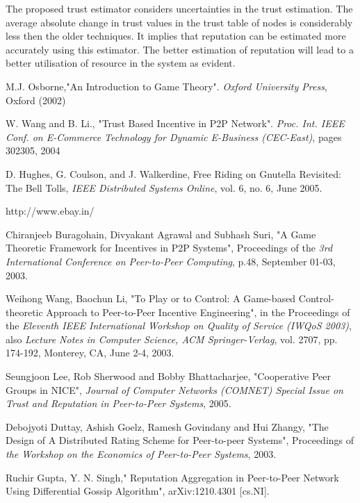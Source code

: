 \documentclass{IEEEtran}
\begin{document}
The proposed trust estimator considers uncertainties in the trust estimation.  The average absolute change in trust values in the trust table of nodes is considerably less then the older techniques. It implies that reputation can be estimated more accurately using this estimator. The better estimation of reputation will lead to a better utilisation of resource in the system as evident. 
\begin{thebibliography}{1}

M.J. Osborne,"An Introduction to Game Theory". \emph{Oxford University Press}, Oxford (2002)

W. Wang and B. Li., "Trust Based Incentive in P2P Network". \emph{Proc. Int.
IEEE Conf. on E-Commerce Technology for Dynamic E-Business (CEC-East)}, pages
302305, 2004

D. Hughes, G. Coulson, and J. Walkerdine, Free Riding on Gnutella Revisited:
The Bell Tolls, \emph{IEEE Distributed Systems Online}, vol. 6, no. 6, June
2005.

http://www.ebay.in/

Chiranjeeb Buragohain, Divyakant Agrawal and Subhash Suri, "A Game
Theoretic Framework for Incentives in P2P Systems", Proceedings of the \emph{3rd
International Conference on Peer-to-Peer Computing}, p.48, September 01-03, 2003.

Weihong Wang, Baochun Li, "To Play or to Control: A Game-based
Control-theoretic Approach to Peer-to-Peer Incentive Engineering", in the
Proceedings of the \emph{Eleventh IEEE International Workshop on Quality of Service (IWQoS 2003)}, also \emph{Lecture Notes in Computer Science, ACM Springer-Verlag}, vol. 2707, pp. 174-192, Monterey, CA, June 2-4, 2003.

Seungjoon Lee, Rob Sherwood and Bobby Bhattacharjee, "Cooperative Peer
Groups in NICE", \emph{Journal of Computer Networks (COMNET) Special Issue on Trust and Reputation in Peer-to-Peer Systems}, 2005.

Debojyoti Duttay, Ashish Goelz, Ramesh Govindany and Hui Zhangy, "The
Design of A Distributed Rating Scheme for Peer-to-peer Systems", Proceedings of
\emph{the Workshop on the Economics of Peer-to-Peer Systems}, 2003.

Ruchir Gupta, Y. N. Singh," Reputation Aggregation in Peer-to-Peer Network Using Differential Gossip
Algorithm", arXiv:1210.4301 [cs.NI].


\end{thebibliography}
\end{document}
